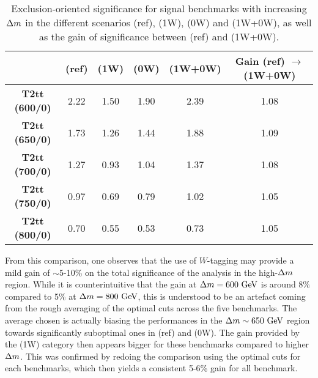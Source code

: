     \begin{table}
        \centering
        \begin{tabular}{c|c|cc|c|c}
                                   & (ref)             & (1W)                         & (0W)                   & (1W+0W) & Gain (ref) $\rightarrow$ (1W+0W)\\
            \hline
            \textbf{T2tt (600/0)}  & 2.22              & 1.50                         & 1.90                   & 2.39    & 1.08 \\
            \textbf{T2tt (650/0)}  & 1.73              & 1.26                         & 1.44                   & 1.88    & 1.09 \\
            \textbf{T2tt (700/0)}  & 1.27              & 0.93                         & 1.04                   & 1.37    & 1.08 \\
            \textbf{T2tt (750/0)}  & 0.97              & 0.69                         & 0.79                   & 1.02    & 1.05 \\
            \textbf{T2tt (800/0)}  & 0.70              & 0.55                         & 0.53                   & 0.73    & 1.05
        \end{tabular}
        \caption{Exclusion-oriented significance for signal benchmarks with
        increasing $\Delta m$ in the different scenarios (ref), (1W), (0W) and
        (1W+0W), as well as the gain of significance between (ref) and (1W+0W).}
        \label{tab:wTaggingSignificanceGain}
    \end{table}

    From this comparison, one observes that the use of $W$-tagging may provide a
    mild gain of $\sim$5-10\% on the total significance of the analysis in the
    high-$\Delta m$ region.  While it is counterintuitive that the gain at
    $\Delta m = 600~\text{GeV}$ is around 8\% compared to 5\% at $\Delta m = 800~\text{GeV}$,
    this is understood to be an artefact coming from the rough averaging of the
    optimal cuts across the five benchmarks. The average chosen is actually
    biasing the performances in the $\Delta m \sim 650~\text{GeV}$ region towards
    significantly suboptimal ones in (ref) and (0W). The gain provided by the
    (1W) category then appears bigger for these benchmarks compared to higher
    $\Delta m$.  This was confirmed by redoing the comparison using the optimal
    cuts for each benchmarks, which then yields a consistent 5-6\% gain for all
    benchmark.

